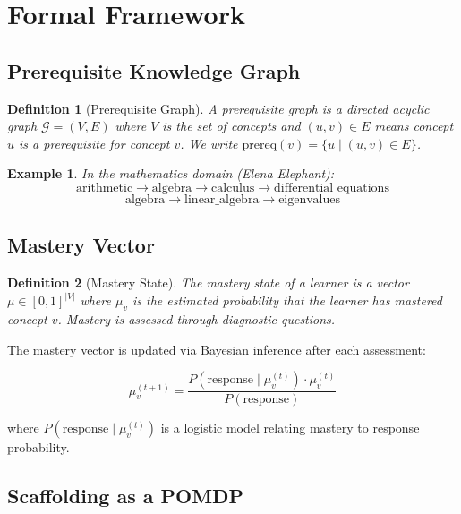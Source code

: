 \documentclass[11pt,letterpaper]{article}
\newtheorem{definition}{Definition}[section]
\newtheorem{example}{Example}[section]
\begin{document}
\section{Formal Framework}

\subsection{Prerequisite Knowledge Graph}

\begin{definition}[Prerequisite Graph]
A prerequisite graph is a directed acyclic graph $\mathcal{G} = (V, E)$ where $V$ is the set of concepts and $(u, v) \in E$ means concept $u$ is a prerequisite for concept $v$. We write $\text{prereq}(v) = \{u \mid (u, v) \in E\}$.
\end{definition}

\begin{example}
In the mathematics domain (Elena Elephant):
\[
\text{arithmetic} \to \text{algebra} \to \text{calculus} \to \text{differential\_equations}
\]
\[
\text{algebra} \to \text{linear\_algebra} \to \text{eigenvalues}
\]
\end{example}

\subsection{Mastery Vector}

\begin{definition}[Mastery State]
The mastery state of a learner is a vector $\mu \in [0, 1]^{|V|}$ where $\mu_v$ is the estimated probability that the learner has mastered concept $v$. Mastery is assessed through diagnostic questions.
\end{definition}

The mastery vector is updated via Bayesian inference after each assessment:

\begin{equation}
\mu_v^{(t+1)} = \frac{P(\text{response} \mid \mu_v^{(t)}) \cdot \mu_v^{(t)}}{P(\text{response})}
\label{eq:mastery_update}
\end{equation}

where $P(\text{response} \mid \mu_v^{(t)})$ is a logistic model relating mastery to response probability.

\subsection{Scaffolding as a POMDP}
\end{document}
